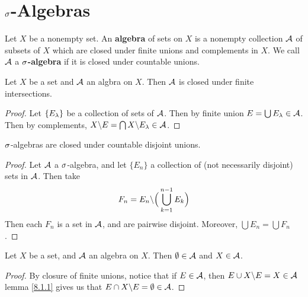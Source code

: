 \section{$\sigma$-Algebras}

\begin{definition}
    Let $X$ be a nonempty set. An  \textbf{algebra} of sets on $X$ is a nonempty
    collection  $\mathcal{A}$ of subsets of $X$ which are closed under finite unions and
    complements in $X$. We call  $\mathcal{A}$ a \textbf{$\sigma$-algebra} if it is closed
    under countable unions.
\end{definition}

\begin{lemma}\label{lemma_1.1.1}
    Let $X$ be a set and $\mathcal{A}$ an algbra on $X$. Then $\mathcal{A}$ is closed under
    finite intersections.
\end{lemma}
\begin{proof}
    Let $\{E_\lambda\}$ be a collection of sets of $\mathcal{A}$. Then by finite union
    $E=\bigcup{E_\lambda} \in \mathcal{A}$. Then by complements,
    $X \backslash E=\bigcap{X \backslash E_\lambda} \in \mathcal{A}$.
\end{proof}
\begin{corollary}
    $\sigma$-algebras are closed under countable disjoint unions.
\end{corollary}
\begin{proof}
    Let $\mathcal{A}$ a $\sigma$-algebra, and let  $\{E_n\}$ a collection of (not
    necessarily disjoint) sets in $\mathcal{A}$. Then take
    \begin{equation}
        F_n=E_n \backslash \Big{(} \bigcup_{k=1}^{n-1}{E_k} \Big{)}
    \end{equation}
    Then each $F_n$ is a set in $\mathcal{A}$, and are pairwise disjoint. Moreover,
    $\bigcup{E_n}=\bigcup{F_n}$.
\end{proof}

\begin{lemma}\label{lemma_1.1.2}
    Let $X$ be a set, and $\mathcal{A}$ an algebra on $X$. Then $\emptyset \in \mathcal{A}$ and
    $X \in \mathcal{A}$.
\end{lemma}
\begin{proof}
    By closure of finite unions, notice that if $E \in \mathcal{A}$, then
    $E \cup X \backslash E = X \in \mathcal{A}$ lemma \ref{8.1.1} gives us that $E \cap
    X \backslash E=\emptyset \in \mathcal{A}$.
\end{proof}

